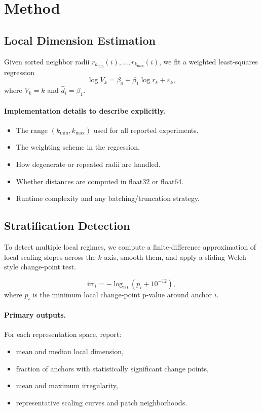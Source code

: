 \documentclass{article}
\newcommand{\dimhat}{\widehat{d}}
\newcommand{\irr}{\mathrm{irr}}
\theoremstyle{definition}
\theoremstyle{plain}
\theoremstyle{remark}
\begin{document}
\section{Method}
\label{sec:method}

\subsection{Local Dimension Estimation}
Given sorted neighbor radii $r_{k_{\min}}(i), \dots, r_{k_{\max}}(i)$, we fit a weighted least-squares regression
\begin{equation}
  \log V_k = \beta_0 + \beta_1 \log r_k + \varepsilon_k,
\end{equation}
where $V_k = k$ and $\dimhat_i = \beta_1$.

\paragraph{Implementation details to describe explicitly.}
\begin{itemize}[leftmargin=1.5em]
\item The range $(k_{\min}, k_{\max})$ used for all reported experiments.
\item The weighting scheme in the regression.
\item How degenerate or repeated radii are handled.
\item Whether distances are computed in float32 or float64.
\item Runtime complexity and any batching/truncation strategy.
\end{itemize}

\subsection{Stratification Detection}
To detect multiple local regimes, we compute a finite-difference approximation of local scaling slopes across the $k$-axis, smooth them, and apply a sliding Welch-style change-point test.

\begin{equation}
  \irr_i = -\log_{10}(p_i + 10^{-12}),
\end{equation}
where $p_i$ is the minimum local change-point p-value around anchor $i$.

\paragraph{Primary outputs.}
For each representation space, report:
\begin{itemize}[leftmargin=1.5em]
\item mean and median local dimension,
\item fraction of anchors with statistically significant change points,
\item mean and maximum irregularity,
\item representative scaling curves and patch neighborhoods.
\end{itemize}
\end{document}
